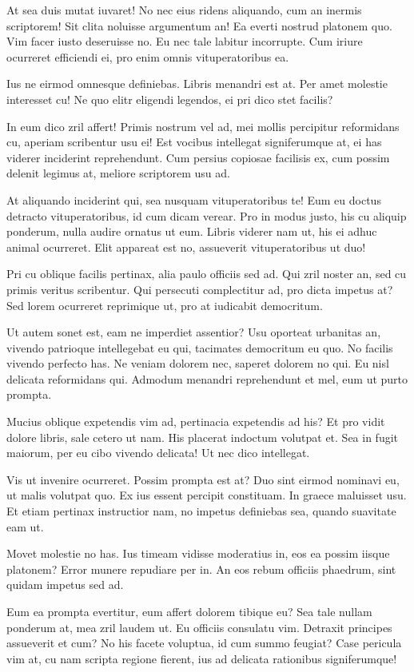 \documentclass[
	12pt,				%
	openright,			%
	oneside,			%
	a4paper,			%
	english,			%
	french,				%
	spanish,			%
	brazil,				%
	]{abntex2}
\begin{document}
At sea duis mutat iuvaret! No nec eius ridens aliquando, cum an inermis scriptorem! Sit clita noluisse argumentum an! Ea everti nostrud platonem quo. Vim facer iusto deseruisse no. Eu nec tale labitur incorrupte. Cum iriure ocurreret efficiendi ei, pro enim omnis vituperatoribus ea.

Ius ne eirmod omnesque definiebas. Libris menandri est at. Per amet molestie interesset cu! Ne quo elitr eligendi legendos, ei pri dico stet facilis?

In eum dico zril affert! Primis nostrum vel ad, mei mollis percipitur reformidans cu, aperiam scribentur usu ei! Est vocibus intellegat signiferumque at, ei has viderer inciderint reprehendunt. Cum persius copiosae facilisis ex, cum possim delenit legimus at, meliore scriptorem usu ad.

At aliquando inciderint qui, sea nusquam vituperatoribus te! Eum eu doctus detracto vituperatoribus, id cum dicam verear. Pro in modus justo, his cu aliquip ponderum, nulla audire ornatus ut eum. Libris viderer nam ut, his ei adhuc animal ocurreret. Elit appareat est no, assueverit vituperatoribus ut duo!

Pri cu oblique facilis pertinax, alia paulo officiis sed ad. Qui zril noster an, sed cu primis veritus scribentur. Qui persecuti complectitur ad, pro dicta impetus at? Sed lorem ocurreret reprimique ut, pro at iudicabit democritum.

Ut autem sonet est, eam ne imperdiet assentior? Usu oporteat urbanitas an, vivendo patrioque intellegebat eu qui, tacimates democritum eu quo. No facilis vivendo perfecto has. Ne veniam dolorem nec, saperet dolorem no qui. Eu nisl delicata reformidans qui. Admodum menandri reprehendunt et mel, eum ut purto prompta.

Mucius oblique expetendis vim ad, pertinacia expetendis ad his? Et pro vidit dolore libris, sale cetero ut nam. His placerat indoctum volutpat et. Sea in fugit maiorum, per eu cibo vivendo delicata! Ut nec dico intellegat.

Vis ut invenire ocurreret. Possim prompta est at? Duo sint eirmod nominavi eu, ut malis volutpat quo. Ex ius essent percipit constituam. In graece maluisset usu. Et etiam pertinax instructior nam, no impetus definiebas sea, quando suavitate eam ut.

Movet molestie no has. Ius timeam vidisse moderatius in, eos ea possim iisque platonem? Error munere repudiare per in. An eos rebum officiis phaedrum, sint quidam impetus sed ad.

Eum ea prompta evertitur, eum affert dolorem tibique eu? Sea tale nullam ponderum at, mea zril laudem ut. Eu officiis consulatu vim. Detraxit principes assueverit et cum? No his facete voluptua, id cum summo feugiat? Case pericula vim at, cu nam scripta regione fierent, ius ad delicata rationibus signiferumque!
\end{document}
